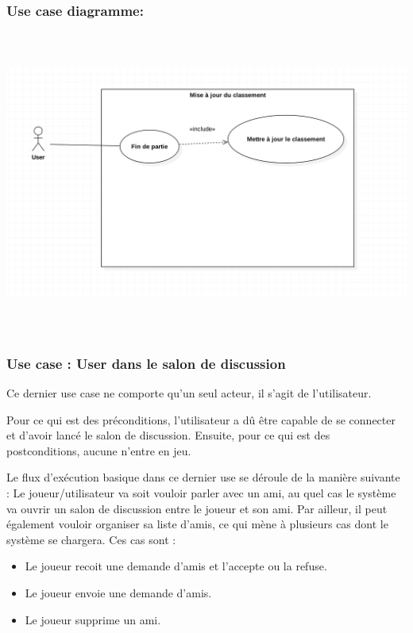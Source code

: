 \documentclass[10pt,a4paper]{article}
\begin{document}
\subsubsection{Use case diagramme:}	
\begin{center}
    \includegraphics[height=10cm,width=15cm]{maj_classement.png}
\end{center}
\newpage
\subsubsection{Use case : User dans le salon de discussion}
\par Ce dernier use case ne comporte qu'un seul acteur, il s'agit de l'utilisateur.\\

\par Pour ce qui est des préconditions, l'utilisateur a dû être capable de se connecter et d'avoir lancé le salon de discussion. Ensuite, pour ce qui est des postconditions, aucune n'entre en jeu.\\

\par Le flux d'exécution basique dans ce dernier use se déroule de la manière suivante :
Le joueur/utilisateur va soit vouloir parler avec un ami, au quel cas le système va ouvrir un salon de discussion entre le joueur et son ami. Par ailleur, il peut également vouloir organiser sa liste d'amis, ce qui mène à plusieurs cas dont le système se chargera. Ces cas sont :
\begin{itemize}
	\item Le joueur recoit une demande d'amis et l'accepte ou la refuse.
    \item Le joueur envoie une demande d'amis.
    \item Le joueur supprime un ami.
\end{itemize}
	
\end{document}
